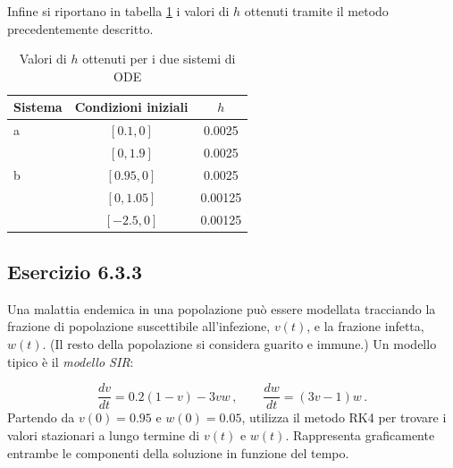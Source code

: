 \documentclass[letterpaper, 12pt]{article}
\numberwithin{equation}{section}    %
\begin{document}
Infine si riportano in tabella \ref{tab:valori_h} i valori di $h$ ottenuti tramite il metodo precedentemente descritto.
\begin{table}[!ht]
    \centering
    \caption{Valori di $h$ ottenuti per i due sistemi di ODE}
    \label{tab:valori_h}
    \begin{tabular}{|l|c|c|}
        \hline
        \textbf{Sistema} & \textbf{Condizioni iniziali} & \textbf{$h$} \\
        \hline
        a & $[0.1, 0]$ & 0.0025 \\
        \cline{2-3}
         & $[0, 1.9]$ & 0.0025 \\
        \hline
        b & $[0.95, 0]$ & 0.0025 \\
        \cline{2-3}
         & $[0, 1.05]$ & 0.00125 \\
        \cline{2-3}
         & $[-2.5, 0]$ & 0.00125 \\
        \hline
    \end{tabular}
\end{table}

\subsection{Esercizio 6.3.3}
Una malattia endemica in una popolazione può essere modellata tracciando la frazione di popolazione suscettibile 
all'infezione, $v(t)$, e la frazione infetta, $w(t)$. (Il resto della popolazione si considera guarito e immune.) 
Un modello tipico è il \textit{modello SIR}:

\begin{equation}
    \frac{dv}{dt} = 0.2(1-v) - 3vw\,, \qquad \frac{dw}{dt} = (3v-1)w\,.
\end{equation}
Partendo da $v(0) = 0.95$ e $w(0) = 0.05$, utilizza il metodo RK4 per trovare i valori stazionari a lungo termine 
di $v(t)$ e $w(t)$. Rappresenta graficamente entrambe le componenti della soluzione in funzione del tempo.
\end{document}
